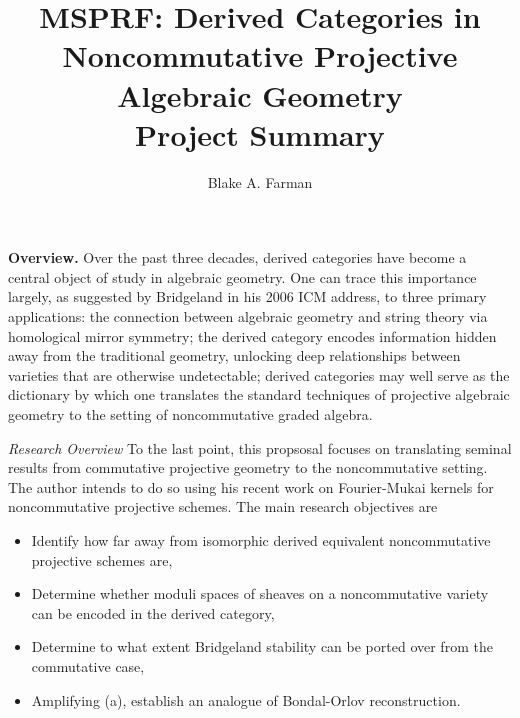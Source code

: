 \documentclass[11pt]{article}
\title{MSPRF: Derived Categories in Noncommutative Projective Algebraic Geometry\\\small{Project Summary}}
\author{Blake A. Farman}
\date{}
\begin{document}
\maketitle

\noindent\textbf{Overview.}
Over the past three decades, derived categories have become a central object of study in algebraic geometry.
One can trace this importance largely, as suggested by Bridgeland in his 2006 ICM address, to three primary applications: the connection between algebraic geometry and string theory via homological mirror symmetry; the derived category encodes information hidden away from the traditional geometry, unlocking deep relationships between varieties that are otherwise undetectable;
derived categories may well serve as the dictionary by which one translates the standard techniques of projective algebraic geometry to the setting of noncommutative graded algebra.

\noindent\emph{Research Overview}
To the last point, this propsosal focuses on translating seminal results from commutative projective geometry to the noncommutative setting.
The author intends to do so using his recent work on Fourier-Mukai kernels for noncommutative projective schemes.
The main research objectives are
\begin{itemize}

\item
  Identify how far away from isomorphic derived equivalent noncommutative projective schemes are,
\item
  Determine whether moduli spaces of sheaves on a noncommutative variety can be encoded in the derived category,
\item
  Determine to what extent Bridgeland stability can be ported over from the commutative case,
\item
  Amplifying (a), establish an analogue of Bondal-Orlov reconstruction.
\end{itemize}
\end{document}
